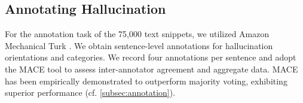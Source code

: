 

%
\vspace{-0.5mm}
\subsection{Annotating Hallucination}
\vspace{-1mm}

For the annotation task of the 75,000 text snippets, we utilized Amazon Mechanical Turk \cite{AMT}. 
We obtain sentence-level annotations for hallucination orientations and categories.
We record four annotations per sentence and adopt the MACE tool \cite{hovy-etal-2013-learning} to assess inter-annotator agreement and aggregate data. MACE has been empirically demonstrated to outperform majority voting, exhibiting superior performance (cf. \cref{subsec:annotation}).

